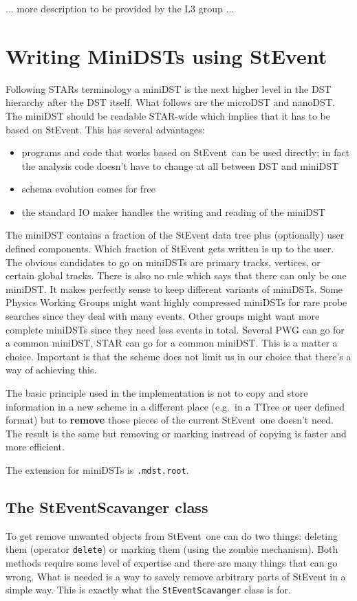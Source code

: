 \documentclass[twoside]{article}
\newcommand{\StEvent}{\textsf{StEvent}}
\begin{document}
... more description to be provided by the L3 group ...  \clearpage

\section{Writing MiniDSTs using StEvent}
\label{sec:miniDST}
Following STARs terminology a miniDST is the next higher level in the
DST hierarchy after the DST itself. What follows are the
microDST and nanoDST.  The miniDST should be readable STAR-wide which
implies that it has to be based on \StEvent. This has several
advantages:
\begin{itemize}
\item programs and code that works based on \StEvent\ can be used
    directly; in fact the analysis code doesn't have to change at all
    between DST and miniDST
\item schema evolution comes for free
\item the standard IO maker handles the writing and reading of the
    miniDST
\end{itemize}

The miniDST contains a fraction of the StEvent data tree plus
(optionally) user defined components.  Which fraction of StEvent gets
written is up to the user.  The obvious candidates to go on miniDSTs
are primary tracks, vertices, or certain global tracks.  There is also
no rule which says that there can only be one miniDST. It makes
perfectly sense to keep different variants of miniDSTs. Some Physics
Working Groups might want highly compressed miniDSTs for rare probe
searches since they deal with many events. Other groups might want
more complete miniDSTs since they need less events in total.  Several
PWG can go for a common miniDST, STAR can go for a common miniDST.
This is a matter a choice.  Important is that the scheme does not
limit us in our choice that there's a way of achieving this.

The basic principle used in the implementation is not to copy and
store information in a new scheme in a different place (e.g.~in a
TTree or user defined format) but to \textbf{remove} those pieces of
the current \StEvent\ one doesn't need. The result is the same but
removing or marking instread of copying is faster and more efficient.

The extension for miniDSTs is \texttt{.mdst.root}.

\subsection{The StEventScavanger class}
 To get remove unwanted objects from \StEvent\ 
one can do two things: deleting them (operator \texttt{delete}) or
marking them (using the zombie mechanism).  Both methods require some
level of expertise and there are many things that can go wrong.  What
is needed is a way to savely remove arbitrary parts of StEvent in a
simple way. This is exactly what the \texttt{StEventScavanger} class
is for.
\end{document}
